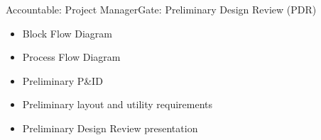 \begin{stagecard}{Accountable: Project Manager}{Gate: Preliminary Design Review (PDR)}
\begin{itemize}[leftmargin=*,itemsep=1pt,topsep=2pt]
\end{itemize}
\tcbline
{}\par
\begin{minipage}[t]{0.485\linewidth}
\begin{itemize}[leftmargin=*,itemsep=1pt,topsep=2pt]
  \item Block Flow Diagram
  \item Process Flow Diagram
  \item Preliminary P\&ID
\end{itemize}
\end{minipage}\hfill
\begin{minipage}[t]{0.485\linewidth}
\begin{itemize}[leftmargin=*,itemsep=1pt,topsep=2pt]
  \item Preliminary layout and utility requirements
  \item Preliminary Design Review presentation
\end{itemize}
\end{minipage}
\tcbline
{}
\end{stagecard}

